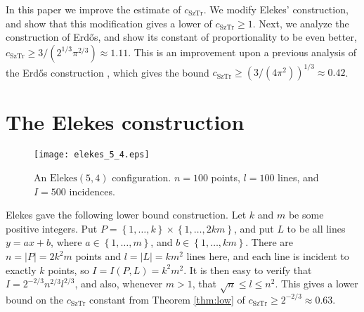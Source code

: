 \documentclass[11pt]{article}
\newcommand\set[1]{\left\{ #1 \right\}}
\newcommand\erdos{{Erd{\H o}s}\xspace}
\newcommand\cst{c_{\mathrm{SzTr}}}
\newcommand\Elekes{\mathrm{Elekes}}
\begin{document}
In this paper we improve the estimate of $\cst$.
We modify Elekes' construction, and show that this modification gives a lower
of $\cst \ge 1$.
Next, we analyze the construction of \erdos \cite{Er-points-lines}, and show its
constant of proportionality to be even better,
$\cst \ge 3/(2^{1/3}\pi^{2/3}) \approx 1.11$.
This is an improvement upon a previous analysis of the \erdos construction
\cite{PT}, which gives the bound $\cst \ge (3/(4\pi^2))^{1/3} \approx 0.42$.

\section{The Elekes construction}
\begin{figure}
\begin{center}
\texttt{[image: elekes\_5\_4.eps]}
\end{center}
\caption{\sf An $\Elekes(5,4)$ configuration. $n = 100$ points, $l = 100$ lines,
and $I = 500$ incidences.} \label{fig:elekes}
\end{figure}
Elekes \cite{El-sums} gave the following lower bound construction.
Let $k$ and $m$ be some positive integers.
Put $P = \set{1, \ldots, k} \times \set{1, \ldots, 2km}$, and put $L$ to be all
lines $y = ax + b$, where $a \in \set{1, \ldots, m}$, and
$b \in \set{1, \ldots, km}$.
There are $n = |P| = 2k^2m$ points and $l = |L| = km^2$ lines here, and each
line is incident to exactly $k$ points, so $I = I(P,L) = k^2m^2$.
It is then easy to verify that $I = 2^{-2/3}n^{2/3}l^{2/3}$, and also, whenever
$m > 1$, that $\sqrt{n} \le l \le n^2$.
This gives a lower bound on the $\cst$ constant from Theorem \ref{thm:low} of
$\cst \ge 2^{-2/3} \approx 0.63$.
\end{document}
